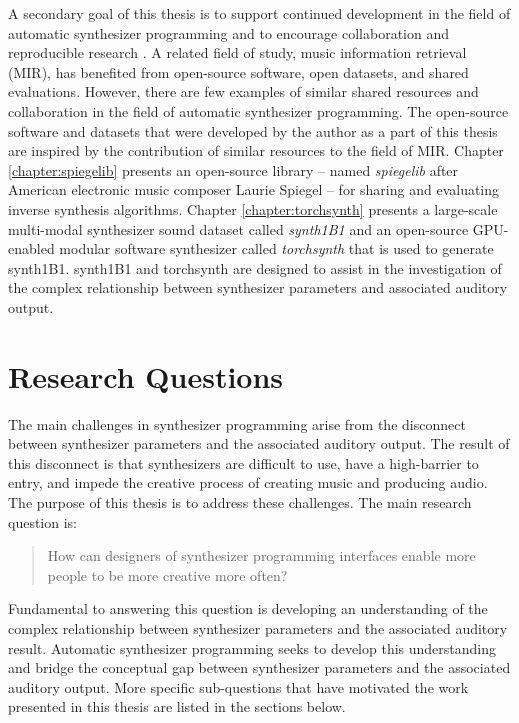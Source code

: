 A secondary goal of this thesis is to support continued development in the field of automatic synthesizer programming and to encourage collaboration and reproducible research \cite{vandewalle2009reproducible}. A related field of study, music information retrieval (MIR), has benefited from open-source software, open datasets, and shared evaluations.
However, there are few examples of similar shared resources and collaboration in the field of automatic synthesizer programming. The open-source software and datasets that were developed by the author as a part of this thesis are inspired by the contribution of similar resources to the field of MIR.  Chapter \ref{chapter:spiegelib} presents an open-source library -- named \textit{spiegelib} after American electronic music composer Laurie Spiegel -- for sharing and evaluating inverse synthesis algorithms. Chapter \ref{chapter:torchsynth} presents a large-scale multi-modal synthesizer sound dataset called \textit{synth1B1} and an open-source GPU-enabled modular software synthesizer called \textit{torchsynth} that is used to generate synth1B1. synth1B1 and torchsynth are designed to assist in the investigation of the complex relationship between synthesizer parameters and associated auditory output.


\section{Research Questions}
The main challenges in synthesizer programming arise from the disconnect between synthesizer parameters and the associated auditory output. The result of this disconnect is that synthesizers are difficult to use, have a high-barrier to entry, and impede the creative process of creating music and producing audio. The purpose of this thesis is to address these challenges. The main research question is:

\begin{quote}
    How can designers of synthesizer programming interfaces enable more people to be more creative more often?
\end{quote}

Fundamental to answering this question is developing an understanding of the complex relationship between synthesizer parameters and the associated auditory result. Automatic synthesizer programming seeks to develop this understanding and bridge the conceptual gap between synthesizer parameters and the associated auditory output. More specific sub-questions that have motivated the work presented in this thesis are listed in the sections below.

